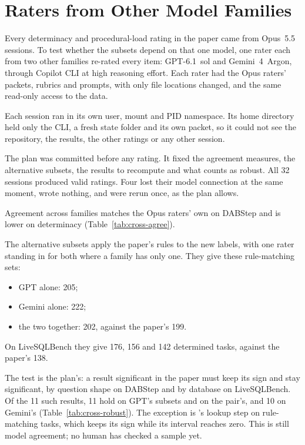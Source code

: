 \section{Raters from Other Model Families}
\label{app:cross-family}

Every determinacy and procedural-load rating in the paper came from Opus~5.5 sessions. To test whether the subsets depend on that one model, one rater each from two other families re-rated every item: GPT-6.1~sol and Gemini~4~Argon, through Copilot CLI at high reasoning effort. Each rater had the Opus raters' packets, rubrics and prompts, with only file locations changed, and the same read-only access to the data.

Each session ran in its own user, mount and PID namespace. Its home directory held only the CLI, a fresh state folder and its own packet, so it could not see the repository, the results, the other ratings or any other session.

The plan was committed before any rating. It fixed the agreement measures, the alternative subsets, the results to recompute and what counts as robust. All 32 sessions produced valid ratings. Four lost their model connection at the same moment, wrote nothing, and were rerun once, as the plan allows.

Agreement across families matches the Opus raters' own on DABStep and is lower on determinacy (Table~\ref{tab:cross-agree}).

The alternative subsets apply the paper's rules to the new labels, with one rater standing in for both where a family has only one. They give these rule-matching sets:
\begin{itemize}
\itemsep0pt
\item GPT alone: 205;
\item Gemini alone: 222;
\item the two together: 202, against the paper's 199.
\end{itemize}
On LiveSQLBench they give 176, 156 and 142 determined tasks, against the paper's 138.

The test is the plan's: a result significant in the paper must keep its sign and stay significant, by question shape on DABStep and by database on LiveSQLBench. Of the 11 such results, 11 hold on GPT's subsets and on the pair's, and 10 on Gemini's (Table~\ref{tab:cross-robust}). The exception is \mQwen{}'s lookup step on rule-matching tasks, which keeps its sign while its interval reaches zero. This is still model agreement; no human has checked a sample yet.

